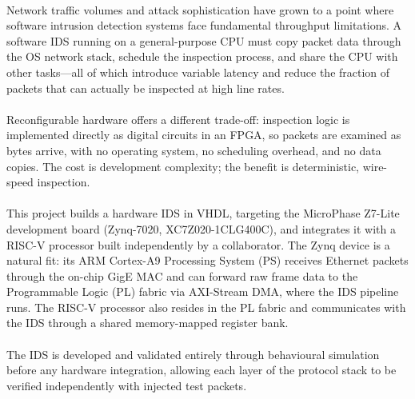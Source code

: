 \paragraph{ }
Network traffic volumes and attack sophistication have grown to a point where software intrusion detection systems face fundamental throughput limitations. A software IDS running on a general-purpose CPU must copy packet data through the OS network stack, schedule the inspection process, and share the CPU with other tasks---all of which introduce variable latency and reduce the fraction of packets that can actually be inspected at high line rates.
\paragraph{}
Reconfigurable hardware offers a different trade-off: inspection logic is implemented directly as digital circuits in an FPGA, so packets are examined as bytes arrive, with no operating system, no scheduling overhead, and no data copies. The cost is development complexity; the benefit is deterministic, wire-speed inspection.
\paragraph{}
This project builds a hardware IDS in VHDL, targeting the MicroPhase Z7-Lite development board (Zynq-7020, XC7Z020-1CLG400C), and integrates it with a RISC-V processor built independently by a collaborator. The Zynq device is a natural fit: its ARM Cortex-A9 Processing System (PS) receives Ethernet packets through the on-chip GigE MAC and can forward raw frame data to the Programmable Logic (PL) fabric via AXI-Stream DMA, where the IDS pipeline runs. The RISC-V processor also resides in the PL fabric and communicates with the IDS through a shared memory-mapped register bank.
\paragraph{}
The IDS is developed and validated entirely through behavioural simulation before any hardware integration, allowing each layer of the protocol stack to be verified independently with injected test packets.

